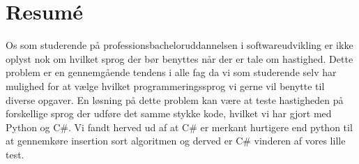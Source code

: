 \documentclass[class=report, crop=false]{standalone}
\begin{document}
    \section{Resumé}
    Os som studerende på professionsbacheloruddannelsen i softwareudvikling er ikke oplyst nok om hvilket sprog der bør benyttes når der er tale om hastighed.
    Dette problem er en gennemgående tendens i alle fag da vi som studerende selv har mulighed for at vælge hvilket programmeringssprog vi gerne vil benytte til diverse opgaver.
    En løsning på dette problem kan være at teste hastigheden på forskellige sprog der udføre det samme stykke kode, hvilket vi har gjort med Python og C\#.
    Vi fandt herved ud af at C\# er merkant hurtigere end python til at gennemkøre insertion sort algoritmen og derved er C\# vinderen af vores lille test.
\end{document}
